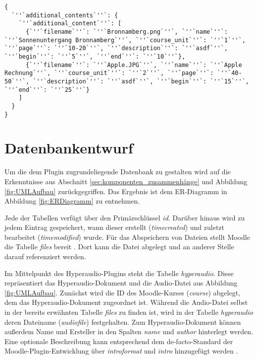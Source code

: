\begin{lstlisting}[basicstyle=\small,
             inputencoding={utf8}, 
             extendedchars=false,
             commentstyle=\color{black}, 
             keywordstyle=\color{black}, 
             escapeinside=``,
             linewidth=\textwidth,
             caption={Beispielhafte \textit{JSON}-Datei},
             label={lst:JSON}]             
{
  `''`additional_contents`''`: {
    `''`additional_content`''`: [
      {`''`filename`''`: `''`Bronnamberg.png`''`, `''`name`''`: `''`Sonnenuntergang Bronnamberg`''`, `''`course_unit`''`: `''`1`''`, `''`page`''`: `''`10-20`''`, `''`description`''`: `''`asdf`''`, `''`begin`''`: `''`5`''`, `''`end`''`: `''`10`''`},
      {`''`filename`''`: `''`Apple.JPG`''`, `''`name`''`: `''`Apple Rechnung`''`, `''`course_unit`''`: `''`2`''`, `''`page`''`: `''`40-50`''`, `''`description`''`: `''`asdf`''`, `''`begin`''`: `''`15`''`, `''`end`''`: `''`25`''`}
    ]
  }
}
\end{lstlisting}

\section{Datenbankentwurf}
Um die dem Plugin zugrundeliegende Datenbank zu gestalten wird auf die Erkenntnisse aus Abschnitt \ref{sec:komponenten_zusammenhänge} und Abbildung \ref{fig:UMLAufbau} zurückgegriffen. Das Ergebnis ist dem ER-Diagramm in Abbildung \ref{fig:ERDiagramm} zu entnehmen.

Jede der Tabellen verfügt über den Primärschlüssel \textit{id}. Darüber hinaus wird zu jedem Eintrag gespeichert, wann dieser erstellt (\textit{timecreated}) und zuletzt bearbeitet (\textit{timemodified}) wurde. Für das Abspeichern von Dateien stellt Moodle die Tabelle \textit{files} bereit \citep{moodle2018file}. Dort kann die Datei abgelegt und an anderer Stelle darauf referenziert werden.

Im Mittelpunkt des Hyperaudio-Plugins steht die Tabelle \textit{hyperaudio}. Diese repräsentiert das Hyperaudio-Dokument und die Audio-Datei aus Abbildung \ref{fig:UMLAufbau}. Zunächst wird die ID des Moodle-Kurses (\textit{course}) abgelegt, dem das Hyperaudio-Dokument zugeordnet ist. Während die Audio-Datei selbst in der bereits erwähnten Tabelle \textit{files} zu finden ist, wird in der Tabelle \textit{hyperaudio} deren Dateiname (\textit{audiofile}) festgehalten. Zum Hyperaudio-Dokument können außerdem Name und Ersteller in den Spalten \textit{name} und \textit{author} hinterlegt werden. Eine optionale Beschreibung kann entsprechend dem de-facto-Standard der Moodle-Plugin-Entwicklung über \textit{introformat} und \textit{intro} hinzugefügt werden \citep{moodle2016activity}.

